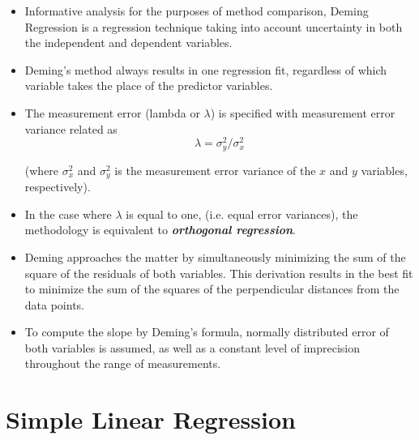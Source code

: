 \documentclass[12pt, a4paper]{report}
\theoremstyle{plain}
\theoremstyle{definition}
\theoremstyle{remark}
\begin{document}
	\begin{itemize}
		\item Informative analysis for the purposes of method comparison, Deming Regression is a regression technique taking into account uncertainty in both the independent and dependent variables.
		
		\item Deming’s method always results in one regression fit, regardless of which variable takes the place of the predictor variables.
		
		
		
		\item The measurement error (lambda or $\lambda$) is specified with measurement error variance related as 
		\[\lambda = \sigma^2_y/\sigma^2_x\]
		
		(where $\sigma^2_x$ and $\sigma^2_y$ is the measurement error variance of the $x$ and $y$ variables, respectively).
		
		\item In the case where $\lambda$ is equal to one, (i.e. equal error variances), the methodology is equivalent to \textit{\textbf{orthogonal regression}}.
		
		\item Deming approaches the matter by simultaneously minimizing the sum of the square of the residuals of both variables. This derivation results in the best fit to minimize the sum of the squares of the perpendicular distances from the data points.
		
		\item To compute the slope by Deming’s formula,  normally distributed error of both variables  is assumed, as well as a constant level of imprecision throughout the range of measurements.
		
	\end{itemize}


\section{Simple Linear Regression}
\end{document}
